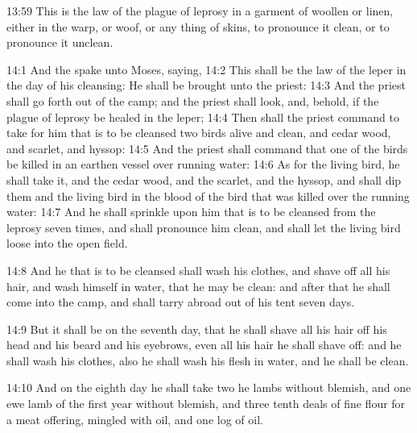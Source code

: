 13:59 This is the law of the plague of leprosy in a garment of woollen
or linen, either in the warp, or woof, or any thing of skins, to
pronounce it clean, or to pronounce it unclean.

14:1 And the \LORD spake unto Moses, saying, 14:2 This shall be the law
of the leper in the day of his cleansing: He shall be brought unto the
priest: 14:3 And the priest shall go forth out of the camp; and the
priest shall look, and, behold, if the plague of leprosy be healed in
the leper; 14:4 Then shall the priest command to take for him that is
to be cleansed two birds alive and clean, and cedar wood, and scarlet,
and hyssop: 14:5 And the priest shall command that one of the birds be
killed in an earthen vessel over running water: 14:6 As for the living
bird, he shall take it, and the cedar wood, and the scarlet, and the
hyssop, and shall dip them and the living bird in the blood of the
bird that was killed over the running water: 14:7 And he shall
sprinkle upon him that is to be cleansed from the leprosy seven times,
and shall pronounce him clean, and shall let the living bird loose
into the open field.

14:8 And he that is to be cleansed shall wash his clothes, and shave
off all his hair, and wash himself in water, that he may be clean: and
after that he shall come into the camp, and shall tarry abroad out of
his tent seven days.

14:9 But it shall be on the seventh day, that he shall shave all his
hair off his head and his beard and his eyebrows, even all his hair he
shall shave off: and he shall wash his clothes, also he shall wash his
flesh in water, and he shall be clean.

14:10 And on the eighth day he shall take two he lambs without
blemish, and one ewe lamb of the first year without blemish, and three
tenth deals of fine flour for a meat offering, mingled with oil, and
one log of oil.

